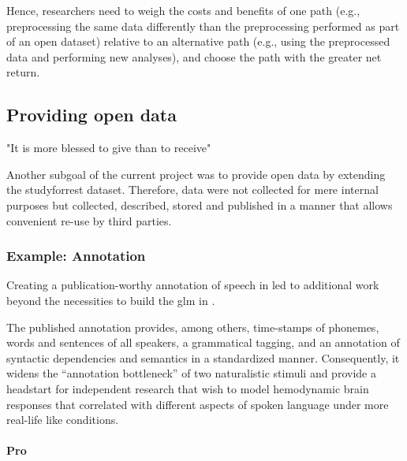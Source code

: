 Hence, researchers need to weigh the costs and benefits of one path (e.g.,
preprocessing the same data differently than the preprocessing performed as part
of an open dataset) relative to an alternative path (e.g., using the
preprocessed data and performing new analyses), and choose the path with the
greater net return.



\subsection{Providing open data}

"It is more blessed to give than to receive"

%
Another subgoal of the current project was to provide open data by extending the
studyforrest dataset.
%
Therefore, data were not collected for mere internal purposes but collected,
described, stored and published in a manner that allows convenient re-use by
third parties.


\subsubsection{Example: Annotation}


Creating a publication-worthy annotation of speech in
\citep{haeusler2021speechanno} led to additional work beyond the necessities to build the \ac{glm} in \citep{haeusler2022processing}.

The published annotation provides, among others, time-stamps of phonemes, words
and sentences of all speakers, a grammatical tagging, and an annotation of
syntactic dependencies and semantics in a standardized manner.
%
Consequently, it widens the ``annotation bottleneck''
\citep{aliko2020naturalistic} of two naturalistic stimuli and provide a
headstart for independent research that wish to model hemodynamic brain
responses that correlated with different aspects of spoken language under more
real-life like conditions.


\paragraph{Pro}


